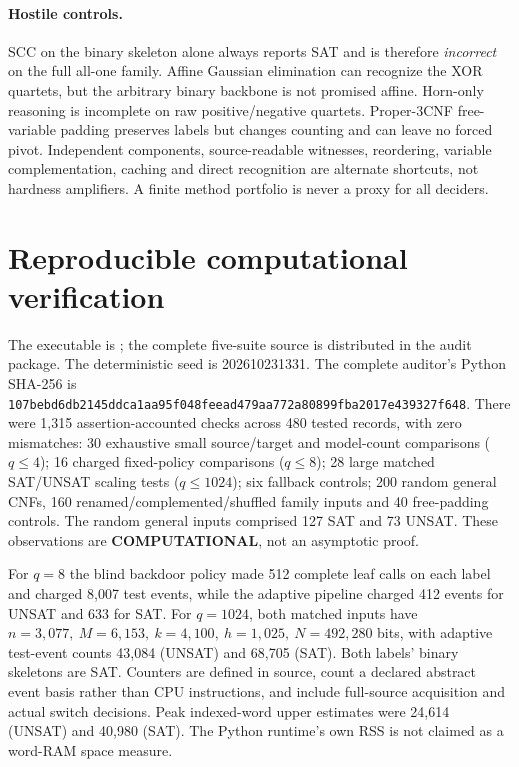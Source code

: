 \documentclass[11pt]{article}
\begin{document}
\paragraph{Hostile controls.}
SCC on the binary skeleton alone always reports SAT and is
therefore \emph{incorrect} on the full all-one family.
Affine Gaussian elimination can recognize the XOR quartets,
but the arbitrary binary backbone is not promised affine.
Horn-only reasoning is incomplete on raw positive/negative
quartets. Proper-3CNF free-variable padding preserves labels
but changes counting and can leave no forced pivot.
Independent components, source-readable witnesses,
reordering, variable complementation, caching and direct
recognition are alternate shortcuts, not hardness amplifiers.
A finite method portfolio is never a proxy for all deciders.

\section{Reproducible computational verification}
The executable is
;
the complete five-suite source is distributed in the audit
package. The deterministic seed is 202610231331.
The complete auditor's Python SHA-256 is
\texttt{107bebd6db2145ddca1aa95f048feead479aa772a80899fba2017e439327f648}.
There were 1,315 assertion-accounted checks across 480 tested
records, with zero mismatches:
30 exhaustive small source/target and model-count comparisons
($q\le4$); 16 charged fixed-policy comparisons ($q\le8$);
28 large matched SAT/UNSAT scaling tests ($q\le1024$);
six fallback controls; 200 random general CNFs, 160
renamed/complemented/shuffled family inputs and 40 free-padding controls.
The random general inputs comprised 127 SAT and 73 UNSAT.
These observations are \textbf{COMPUTATIONAL}, not an asymptotic proof.

For $q=8$ the blind backdoor policy made 512 complete
leaf calls on each label and charged 8,007 test events, while
the adaptive pipeline charged 412 events for UNSAT and
633 for SAT. For $q=1024$, both matched inputs have
$n=3,077,\ M=6,153,\ k=4,100,\ h=1,025,\ N=492,280$ bits,
with adaptive test-event counts 43,084 (UNSAT) and 68,705 (SAT).
Both labels' binary skeletons are SAT.
Counters are defined in source, count a declared abstract event
basis rather than CPU instructions, and include full-source
acquisition and actual switch decisions. Peak indexed-word
upper estimates were 24,614 (UNSAT) and 40,980 (SAT).
The Python runtime's own RSS is not claimed as a word-RAM
space measure.
\end{document}
